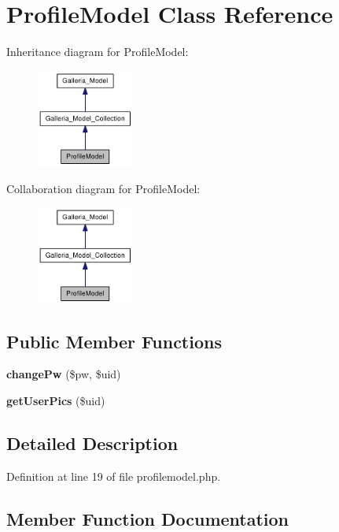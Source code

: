 \section{ProfileModel Class Reference}
\label{classProfileModel}
Inheritance diagram for ProfileModel:\nopagebreak
\begin{figure}[H]
\begin{center}
\leavevmode
\includegraphics[width=91pt]{classProfileModel__inherit__graph}
\end{center}
\end{figure}
Collaboration diagram for ProfileModel:\nopagebreak
\begin{figure}[H]
\begin{center}
\leavevmode
\includegraphics[width=91pt]{classProfileModel__coll__graph}
\end{center}
\end{figure}
\subsection*{Public Member Functions}
\begin{CompactItemize}
\item 
{\bf changePw} (\$pw, \$uid)
\item 
{\bf getUserPics} (\$uid)
\end{CompactItemize}


\subsection{Detailed Description}


Definition at line 19 of file profilemodel.php.

\subsection{Member Function Documentation}
